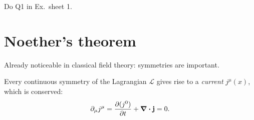 \begin{example}
Do Q1 in Ex.~sheet 1.
\end{example}

\section{Noether's theorem}%
\label{sec:noether_s_theorem}

Already noticeable in classical field theory: symmetries are important.

\begin{theorem}
  Every continuous symmetry of the Lagrangian $\mathcal{L}$ gives rise to a \emph{current} $j^\mu(x)$, which is conserved:
  \begin{equation}
    \partial_\mu j^\mu = \pdv{(j^0)}{t} + \div \vb{j} = 0.
  \end{equation}
\end{theorem}

